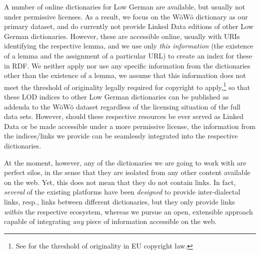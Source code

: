 \documentclass[11pt]{article}
\begin{document}
A number of online dictionaries for Low German are available, but usually not under permissive licenses. As a result, we focus on the WöWö dictionary as our primary dataset, and do currently not provide Linked Data editions of other Low German dictionaries. However, these are accessible online, usually with URIs identifying the respective lemma, and we use only \emph{this information} (the existence of a lemma and the assignment of a particular URL) to create an index for these in RDF. We neither apply nor use any specific information from the dictionaries other than the existence of a lemma, we assume that this information does not meet the threshold of originality legally required for copyright to apply,\footnote{See \citet{Margoni2016} for the threshold of originality in EU copyright law.}
so that these LOD indices to other Low German dictionaries can be published as addenda to the WöWö dataset regardless of the licensing situation of the full data sets. However, should these respective resources be ever served as Linked Data or be made accessible under a more permissive license, the information from the indices/links we provide can be seamlessly integrated into the respective dictionaries.

At the moment, however, any of the dictionaries we are going to work with are perfect silos, in the sense that they are isolated from any other content available on the web. Yet, this does not mean that they do not contain links. In fact, \emph{several} of the existing platforms have been \emph{designed} to provide inter-dialectal links, resp., links between different dictionaries, but they only provide links \emph{within} the respective ecosystem, whereas we pursue an open, extensible approach capable of integrating \emph{any} piece of information accessible on the web. 
\end{document}
